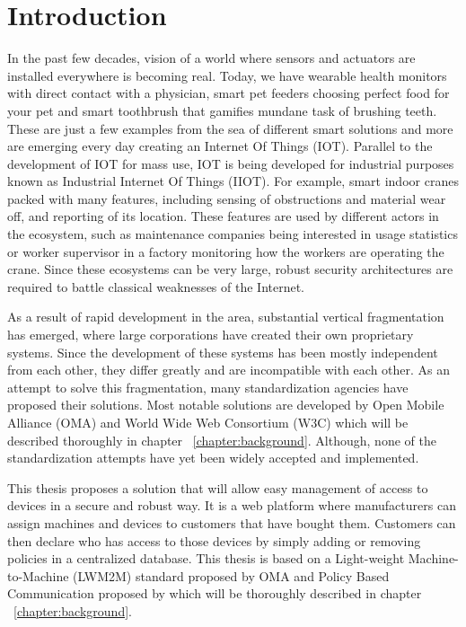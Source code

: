 \chapter{Introduction}

In the past few decades, vision of a world where sensors and actuators are installed everywhere is becoming real. Today, we have wearable health monitors with direct contact with a physician, smart pet feeders choosing perfect food for your pet and smart toothbrush that gamifies mundane task of brushing teeth. These are just a few examples from the sea of different smart solutions and more are emerging every day creating an Internet Of Things (IOT). Parallel to the development of IOT for mass use, IOT is being developed for industrial purposes known as Industrial Internet Of Things (IIOT). For example, smart indoor cranes packed with many features, including sensing of obstructions and material wear off, and reporting of its location. These features are used by different actors in the ecosystem, such as maintenance companies being interested in usage statistics or worker supervisor in a factory monitoring how the workers are operating the crane. Since these ecosystems can be very large, robust security architectures are required to battle classical weaknesses of the Internet.

As a result of rapid development in the area, substantial vertical fragmentation has emerged, where large corporations have created their own proprietary systems. Since the development of these systems has been mostly independent from each other, they differ greatly and are incompatible with each other. As an attempt to solve this fragmentation, many standardization agencies have proposed their solutions. Most notable solutions are developed by Open Mobile Alliance (OMA) and World Wide Web Consortium (W3C) which will be described thoroughly in chapter ~\ref{chapter:background}. Although, none of the standardization attempts have yet been widely accepted and implemented.

This thesis proposes a solution that will allow easy management of access to devices in a secure and robust way. It is a web platform where manufacturers can assign machines and devices to customers that have bought them. Customers can then declare who has access to those devices by simply adding or removing policies in a centralized database. This thesis is based on a Light-weight Machine-to-Machine (LWM2M) standard proposed by OMA and Policy Based Communication proposed by \cite{Kantola} which will be thoroughly described in chapter ~\ref{chapter:background}.

